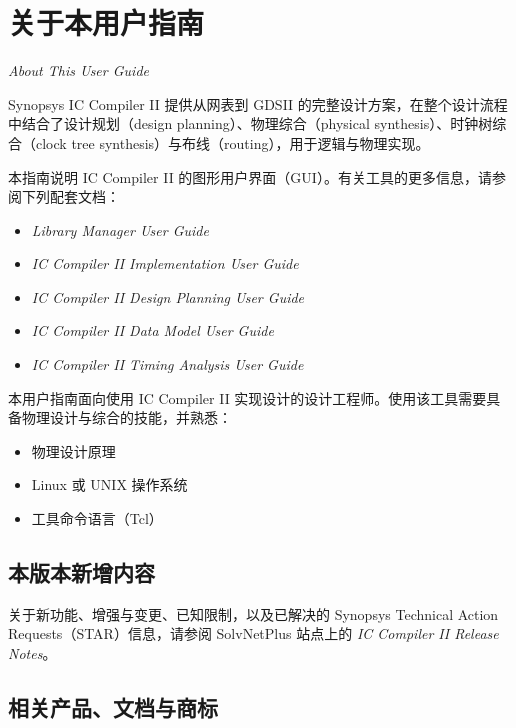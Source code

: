 \chapter*{关于本用户指南}

\noindent\textit{About This User Guide}

Synopsys IC Compiler II 提供从网表到 GDSII 的完整设计方案，在整个设计流程中结合了设计规划（design planning）、物理综合（physical synthesis）、时钟树综合（clock tree synthesis）与布线（routing），用于逻辑与物理实现。

本指南说明 IC Compiler II 的图形用户界面（GUI）。有关工具的更多信息，请参阅下列配套文档：
\begin{itemize}
  \item \textit{Library Manager User Guide}
  \item \textit{IC Compiler II Implementation User Guide}
  \item \textit{IC Compiler II Design Planning User Guide}
  \item \textit{IC Compiler II Data Model User Guide}
  \item \textit{IC Compiler II Timing Analysis User Guide}
\end{itemize}

本用户指南面向使用 IC Compiler II 实现设计的设计工程师。使用该工具需要具备物理设计与综合的技能，并熟悉：
\begin{itemize}
  \item 物理设计原理
  \item Linux 或 UNIX 操作系统
  \item 工具命令语言（Tcl）
\end{itemize}

\section*{本版本新增内容}

关于新功能、增强与变更、已知限制，以及已解决的 Synopsys Technical Action Requests（STAR）信息，请参阅 SolvNetPlus 站点上的 \textit{IC Compiler II Release Notes}。

\section*{相关产品、文档与商标}

